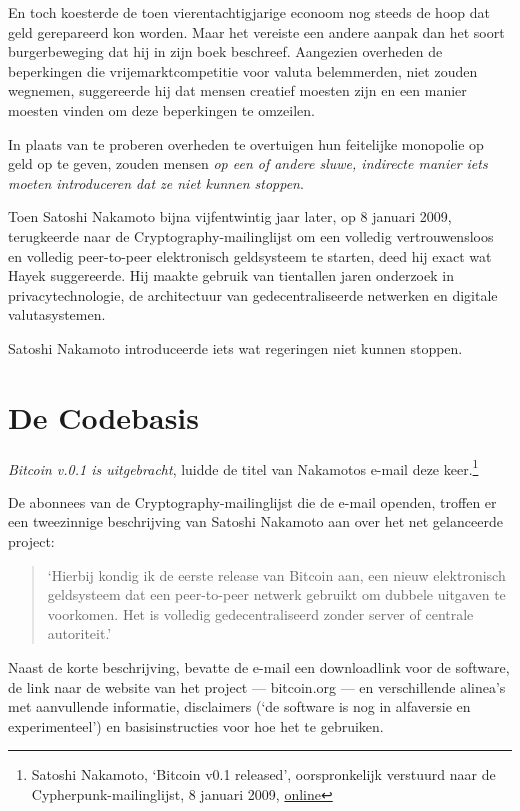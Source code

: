 \documentclass[
  a5paper,
  smalldemyvopaper,11pt,twoside,onecolumn,openright,extrafontsizes]{memoir}
\begin{document}
En toch koesterde de toen vierentachtigjarige econoom nog steeds de hoop
dat geld gerepareerd kon worden. Maar het vereiste een andere aanpak dan
het soort burgerbeweging dat hij in zijn boek beschreef. Aangezien
overheden de beperkingen die vrijemarktcompetitie voor valuta
belemmerden, niet zouden wegnemen, suggereerde hij dat mensen creatief
moesten zijn en een manier moesten vinden om deze beperkingen te
omzeilen.

In plaats van te proberen overheden te overtuigen hun feitelijke
monopolie op geld op te geven, zouden mensen \emph{op een of andere
sluwe, indirecte manier iets moeten introduceren dat ze niet kunnen
stoppen}.

Toen Satoshi Nakamoto bijna vijfentwintig jaar later, op 8 januari 2009,
terugkeerde naar de Cryptography-mailinglijst om een volledig
vertrouwensloos en volledig peer-to-peer elektronisch geldsysteem te
starten, deed hij exact wat Hayek suggereerde. Hij maakte gebruik van
tientallen jaren onderzoek in privacytechnologie, de architectuur van
gedecentraliseerde netwerken en digitale valutasystemen.

Satoshi Nakamoto introduceerde iets wat regeringen niet kunnen stoppen.

\section{De Codebasis}\label{de-codebasis}

\emph{Bitcoin v.0.1 is uitgebracht}, luidde de titel van Nakamotos
e-mail deze keer.\footnote{Satoshi Nakamoto, `Bitcoin v0.1 released',
  oorspronkelijk verstuurd naar de Cypherpunk-mailinglijst, 8 januari
  2009,
  \href{https://www.mail-archive.com/cryptography@metzdowd.com/msg10142.html}{online}}

De abonnees van de Cryptography-mailinglijst die de e-mail openden,
troffen er een tweezinnige beschrijving van Satoshi Nakamoto aan over
het net gelanceerde project:

\begin{quote}
`Hierbij kondig ik de eerste release van Bitcoin aan, een nieuw
elektronisch geldsysteem dat een peer-to-peer netwerk gebruikt om
dubbele uitgaven te voorkomen. Het is volledig gedecentraliseerd zonder
server of centrale autoriteit.'
\end{quote}

Naast de korte beschrijving, bevatte de e-mail een downloadlink voor de
software, de link naar de website van het project --- bitcoin.org --- en
verschillende alinea's met aanvullende informatie, disclaimers (`de
software is nog in alfaversie en experimenteel') en basisinstructies
voor hoe het te gebruiken.
\end{document}
